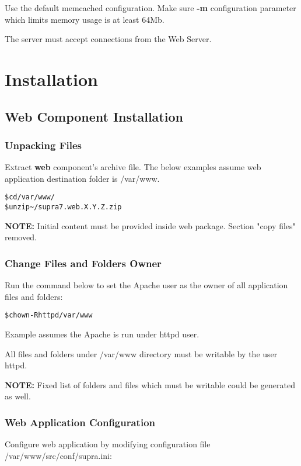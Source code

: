 \documentclass[12pt]{article}
\newcommand{\vigShowNotes}{1}
\newcommand{\vigPackageName}{supra7}
\newcommand{\vigPathToProject}{/var/www}
\newcommand{\vigPathToSrc}{/src}
\newcommand{\vigReleasePath}{\textasciitilde/}
\newcommand{\note}[1]{
\textbf{NOTE:} 
#1
}
\begin{document}
Use the default memcached configuration. Make sure \textbf{-m} configuration parameter which limits memory usage is at least 64Mb.

The server must accept connections from the Web Server.

\section{Installation}

\subsection{Web Component Installation}

\subsubsection{Unpacking Files}

Extract \textbf{web} component's archive file. The below examples assume web application destination folder is \textsf{{\vigPathToProject}}.

\begin{alltt}
\$ cd \vigPathToProject/
\$ unzip {\vigReleasePath}{\vigPackageName}.web.X.Y.Z.zip
\end{alltt}

\note{Initial content must be provided inside web package. Section "copy files" removed.}

\subsubsection{Change Files and Folders Owner\label{fileOwnerSection}}

Run the command below to set the Apache user as the owner of all application files and folders:

\begin{alltt}
\$ chown -R httpd \vigPathToProject
\end{alltt}

Example assumes the Apache is run under \textsf{httpd} user.

All files and folders under \textsf{\vigPathToProject} directory must be writable by the user \textsf{httpd}.

\note{Fixed list of folders and files which must be writable could be generated as well.}

\subsubsection{Web Application Configuration}
Configure web application by modifying configuration file \textsf{\vigPathToProject\vigPathToSrc/conf/supra.ini}:
\end{document}

